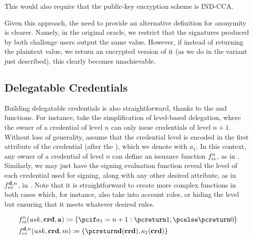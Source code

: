 This would also require that the public-key encryption scheme is IND-CCA.

Given this approach, the need to provide an alternative definition for anonymity
is clearer. Namely, in the original \CHALb oracle, we restrict that the
signatures produced by both challenge users output the same \yeval value.
However, if instead of returning the plaintext \yeval value, we return an
encrypted version of it (as we do in the variant just described), this clearly
becomes unachievable.


\subsection{Delegatable Credentials}
\label{ssec:uas-delcred}

Building delegatable credentials is also straightforward, thanks to the \fissue
and \feval functions. For instance, take the simplification of level-based
delegation, where the owner of a credential of level $n$ can only issue
credentials of level $n+1$. Without loss of generality, assume that the
credential level is encoded in the first attribute of the credential (after the
\usk), which we denote with $a_1$. In this context, any owner of a credential of
level $n$ can define an issuance function $f_{is}^n$, as in
. Similarly, we may just have the signing evaluation
function reveal the level of each credential used for signing, along with any
other desired attribute, as in $f_{ev}^{\mathbf{d},n}$, in
. Note that it is straightforward to create more
complex functions in both cases which, for instance, also take into account
roles, or hiding the level but ensuring that it meets whatever desired rules.

\begin{align}
  & \fissue^n(\usk,\scred,\attrs) \coloneqq \lbrace \pcif a_1 = n+1: \pcreturn 1;
  \pcelse \pcreturn 0 \rbrace \nonumber \\
  & \feval^{\dattrs,n}(\usk,\scred,\msg) \coloneqq \lbrace \pcreturn
    \dattrs(\scred),a_1(\scred) \rbrace  
  \label{eq:uas-delcred-func}
\end{align}


